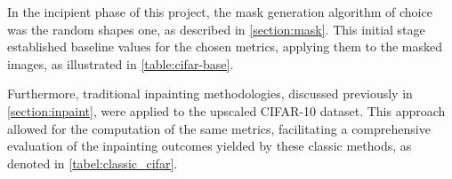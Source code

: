 In the incipient phase of this project, the mask generation algorithm of choice was the random shapes one, as described in \autoref{section:mask}. This initial stage established baseline values for the chosen metrics, applying them to the masked images, as illustrated in \autoref{table:cifar-base}.
\begin{table}[ht]
    \centering
    \caption[Baseline values on the $64\stimes 64$ upscaled CIFAR-10 dataset]{Baseline values on the $64\stimes 64$ upscaled CIFAR-10 dataset\\(random shapes mask generation)}
    \label{table:cifar-base}
\end{table}
Furthermore, traditional inpainting methodologies, discussed previously in \autoref{section:inpaint}, were applied to the upscaled CIFAR-10 dataset. This approach allowed for the computation of the same metrics, facilitating a comprehensive evaluation of the inpainting outcomes yielded by these classic methods, as denoted in \autoref{tabel:classic_cifar}.

